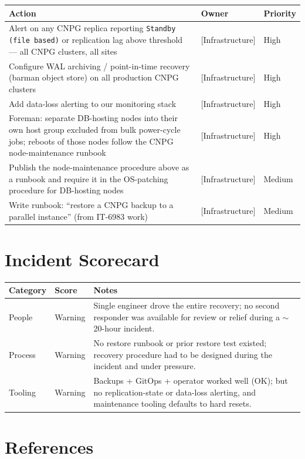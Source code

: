 \documentclass[PMO,authoryear,toc]{lsstdoc}
\begin{document}
\begin{longtable}{p{}p{}p{}}
\hline
\textbf{Action} & \textbf{Owner} & \textbf{Priority} \\
\hline
\endhead
Alert on any CNPG replica reporting \texttt{Standby (file based)} or
  replication lag above threshold --- all CNPG clusters, all sites &
  [Infrastructure] & High \\
Configure WAL archiving / point-in-time recovery (barman object store) on all
  production CNPG clusters & [Infrastructure] & High \\
Add data-loss alerting to our monitoring stack & [Infrastructure] & High \\
Foreman: separate DB-hosting nodes into their own host group excluded from
  bulk power-cycle jobs; reboots of those nodes follow the CNPG
  node-maintenance runbook & [Infrastructure] & High \\
Publish the node-maintenance procedure above as a runbook and require it in
  the OS-patching procedure for DB-hosting nodes & [Infrastructure] & Medium \\
Write runbook: ``restore a CNPG backup to a parallel instance'' (from IT-6983
  work) & [Infrastructure] & Medium \\
\hline
\end{longtable}

\section{Incident Scorecard}

\begin{longtable}{p{}p{}p{}}
\hline
\textbf{Category} & \textbf{Score} & \textbf{Notes} \\
\hline
\endhead
People & Warning & Single engineer drove the entire recovery; no second
  responder was available for review or relief during a $\sim$20-hour
  incident. \\
Process & Warning & No restore runbook or prior restore test existed; recovery
  procedure had to be designed during the incident and under pressure. \\
Tooling & Warning & Backups + GitOps + operator worked well (OK); but no
  replication-state or data-loss alerting, and maintenance tooling defaults to
  hard resets. \\
\hline
\end{longtable}

\section{References}
\end{document}
